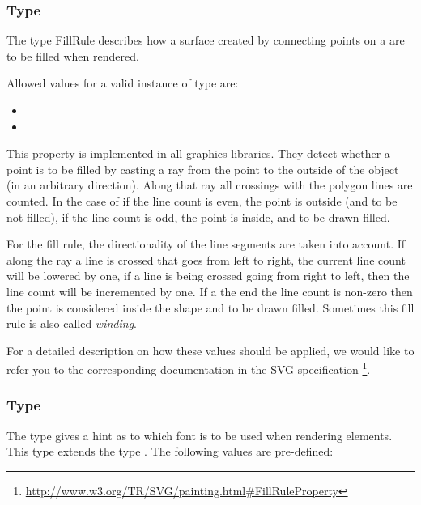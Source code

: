 \subsubsection{Type \fixttspace{}}

The type FillRule describes how a surface created by connecting 
points on a \Polygon are to be filled when rendered. 

Allowed values for a valid instance of type  are:

\begin{itemize}
 \item {} 
 \item {}
\end{itemize}

This property is implemented in all graphics libraries. They detect whether 
a point is to be filled by casting a ray from the point to the outside of the 
object (in an arbitrary direction). Along that ray all crossings with 
the polygon lines are counted. In the case of  if the line count 
is even, the point is outside (and to be not filled), if the line count is odd, 
the point is inside, and to be drawn filled. 

For the  fill rule, the directionality of the line segments are 
taken into account. If along the ray a line is crossed that goes from left to 
right, the current line count will be lowered by one, if a line is being crossed 
going from right to left, then the line count will be incremented by one. If a 
the end the line count is non-zero then the point is considered inside the shape 
and to be drawn filled. Sometimes this fill rule is also called \emph{winding}. 

For a detailed description on how these values should be applied, we would like 
to refer you to the corresponding documentation in the SVG specification  
\footnote{ \url{http://www.w3.org/TR/SVG/painting.html\#FillRuleProperty} }. 

\subsubsection{Type \fixttspace{}}

The \FontFamily type gives a hint as to which font is to be used when
rendering \Text elements. This type extends the type . The following values are pre-defined: 

